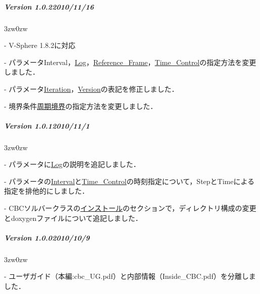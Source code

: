 {\vspace{3mm}

%
\subparagraph{Version 1.0.2\hspace{1cm}2010/11/16}

\begin{description}
\begin{indentation}{3zw}{0zw}
\item[-] V-Sphere 1.8.2に対応
\item[-] パラメータInterval，\hyperlink{tgt:log}{Log}，\hyperlink{tgt:reference_frame}{Reference\_Frame}，\hyperlink{tgt:time_control}{Time\_Control}の指定方法を変更しました．
\item[-] パラメータ\hyperlink{tgt:iteration}{Iteration}，\hyperlink{tgt:version}{Version}の表記を修正しました．
\item[-] 境界条件\hyperlink{tgt:preriodic}{周期境界}の指定方法を変更しました．
\end{indentation}
\end{description}

\vspace{3mm}

%
\subparagraph{Version 1.0.1\hspace{1cm}2010/11/1}

\begin{description}
\begin{indentation}{3zw}{0zw}
\item[-] パラメータに\hyperlink{tgt:log}{Log}の説明を追記しました．
\item[-] パラメータの\hyperlink{tgt:interval}{Interval}と\hyperlink{tgt:time_control}{Time\_Control}の時刻指定について，StepとTimeによる指定を排他的にしました．
\item[-] CBCソルバークラスの\hyperlink{tgt:installCBC}{インストール}のセクションで，ディレクトリ構成の変更とdoxygenファイルについて追記しました．
\end{indentation}
\end{description}

\vspace{3mm}

%
\subparagraph{Version 1.0.0\hspace{1cm}2010/10/9}

\begin{description}
\begin{indentation}{3zw}{0zw}
\item[-] ユーザガイド（本編:cbc\_UG.pdf）と内部情報（Inside\_CBC.pdf）を分離しました．
\end{indentation}
\end{description}

} %
